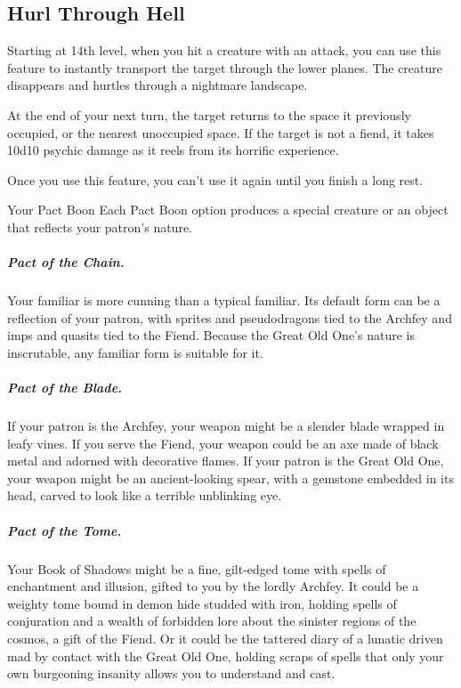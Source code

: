 \subsection{Hurl Through Hell}

Starting at 14th level, when you hit a creature with an attack, you can use this feature to instantly transport the target through the lower planes. The creature disappears and hurtles through a nightmare landscape.

At the end of your next turn, the target returns to the space it previously occupied, or the nearest unoccupied space. If the target is not a fiend, it takes 10d10 psychic damage as it reels from its horrific experience.

Once you use this feature, you can't use it again until you finish a long rest.

\begin{DndComment}{Your Pact Boon}
    Each Pact Boon option produces a special creature or an object that reflects your patron's nature.
    
    \subparagraph*{Pact of the Chain.} Your familiar is more cunning than a typical familiar. Its default form can be a reflection of your patron, with sprites and pseudodragons tied to the Archfey and imps and quasits tied to the Fiend. Because the Great Old One's nature is inscrutable, any familiar form is suitable for it.
    
    \subparagraph*{Pact of the Blade.} If your patron is the Archfey, your weapon might be a slender blade wrapped in leafy vines. If you serve the Fiend, your weapon could be an axe made of black metal and adorned with decorative flames. If your patron is the Great Old One, your weapon might be an ancient-looking spear, with a gemstone embedded in its head, carved to look like a terrible unblinking eye.
    
    \subparagraph*{Pact of the Tome.} Your Book of Shadows might be a fine, gilt-edged tome with spells of enchantment and illusion, gifted to you by the lordly Archfey. It could be a weighty tome bound in demon hide studded with iron, holding spells of conjuration and a wealth of forbidden lore about the sinister regions of the cosmos, a gift of the Fiend. Or it could be the tattered diary of a lunatic driven mad by contact with the Great Old One, holding scraps of spells that only your own burgeoning insanity allows you to understand and cast.    
\end{DndComment}
